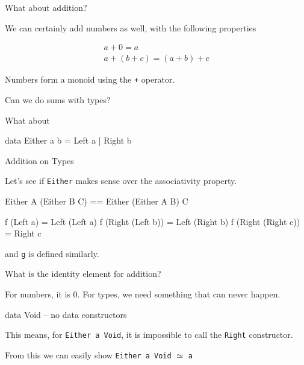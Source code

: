 \documentclass[ignorenonframetext,]{beamer}
\begin{document}
\begin{frame}[fragile]{What about addition?}

We can certainly add numbers as well, with the following properties

\[
\begin{aligned}
a + 0 = a \\
a + (b + c) = (a + b) + c
\end{aligned}
\]

\pause

Numbers form a monoid using the \texttt{+} operator.

Can we do sums with types?

\pause

What about

\begin{haskellcode}
data Either a b = Left a | Right b
\end{haskellcode}

\end{frame}

\begin{frame}[fragile]{Addition on Types}

Let's see if \texttt{Either} makes sense over the associativity
property.

\begin{haskellcode}
Either A (Either B C) == Either (Either A B) C
\end{haskellcode}

\pause

\begin{haskellcode}
f (Left a) = Left (Left a)
f (Right (Left b)) = Left (Right b)
f (Right (Right c)) = Right c
\end{haskellcode}

and \texttt{g} is defined similarly.

\end{frame}

\begin{frame}[fragile]{What is the identity element for addition?}

For numbers, it is 0. For types, we need something that can never
happen.

\pause

\begin{haskellcode}
data Void -- no data constructors
\end{haskellcode}

\pause

This means, for \texttt{Either\ a\ Void}, it is impossible to call the
\texttt{Right} constructor.

\pause

From this we can easily show \texttt{Either\ a\ Void} \(\simeq\)
\texttt{a}

\end{frame}
\end{document}
